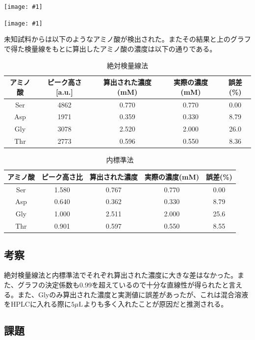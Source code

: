 \documentclass[a4paper,papersize,dvipdfmx]{jsarticle}
\newcommand{\pict}[2]{\begin{center} \texttt{[image: \#1]} \end{center}}   %
\begin{document}
\pict{imgs/1-2-1.png}{14}
\pict{imgs/1-2-2.png}{14}

未知試料からは以下のようなアミノ酸が検出された。またその結果と上のグラフで得た検量線をもとに算出したアミノ酸の濃度は以下の通りである。



\begin{table}[H]
\begin{center}
\begin{tabular}{|c|c|c|c|c|}
\hline
アミノ酸 & ピーク高さ [a.u.] & 算出された濃度(mM) & 実際の濃度(mM) & 誤差(\%) \\ \hline
Ser  & 4862  & 0.770 & 0.770 & 0.00 \\ \hline
Asp  & 1971  & 0.359 & 0.330 & 8.79 \\ \hline
Gly  & 3078  & 2.520 & 2.000 & 26.0 \\ \hline
Thr  & 2773  & 0.596 & 0.550 & 8.36  \\ \hline
\end{tabular}
\caption{絶対検量線法}
\end{center}
\end{table}

\begin{table}[H]
\begin{center}
\begin{tabular}{|c|c|c|c|c|}
\hline
アミノ酸 & ピーク高さ比 & 算出された濃度 & 実際の濃度(mM) & 誤差(\%) \\ \hline
Ser  & 1.580  & 0.767 & 0.770 & 0.00 \\ \hline
Asp  & 0.640  & 0.362 & 0.330 & 8.79  \\ \hline
Gly  & 1.000  & 2.511 & 2.000 & 25.6 \\ \hline
Thr  & 0.901  & 0.597 & 0.550 & 8.55 \\ \hline
\end{tabular}
\caption{内標準法}
\end{center}
\end{table}


\subsection*{考察}
絶対検量線法と内標準法でそれぞれ算出された濃度に大きな差はなかった。また、グラフの決定係数も0.99を超えているので十分な直線性が得られたと言える。また、Glyのみ算出された濃度と実測値に誤差があったが、これは混合溶液をHPLCに入れる際に$5\rm \mu L$よりも多く入れたことが原因だと推測される。

\subsection*{課題}
\end{document}
